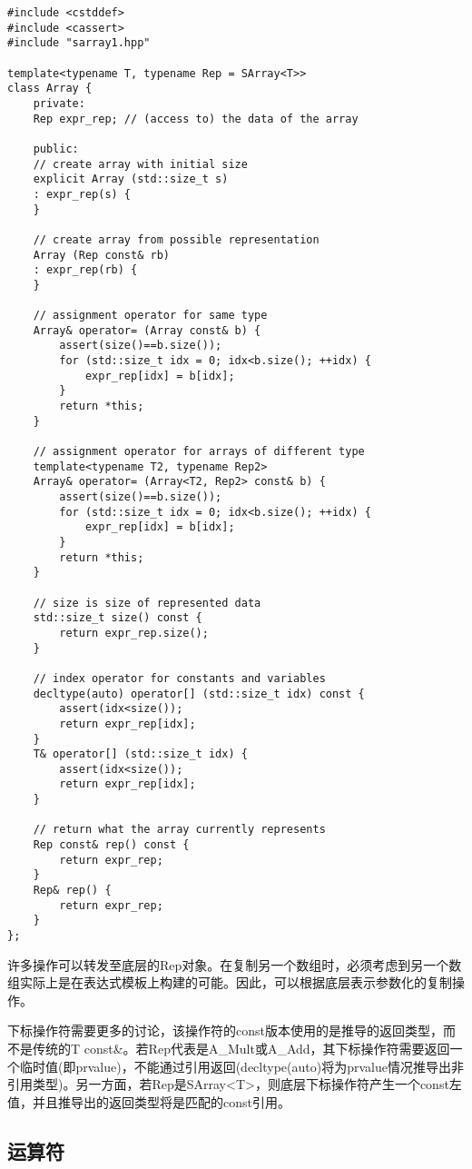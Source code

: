 \begin{lstlisting}[style=styleCXX]
#include <cstddef>
#include <cassert>
#include "sarray1.hpp"

template<typename T, typename Rep = SArray<T>>
class Array {
	private:
	Rep expr_rep; // (access to) the data of the array
	
	public:
	// create array with initial size
	explicit Array (std::size_t s)
	: expr_rep(s) {
	}

	// create array from possible representation
	Array (Rep const& rb)
	: expr_rep(rb) {
	}

	// assignment operator for same type
	Array& operator= (Array const& b) {
		assert(size()==b.size());
		for (std::size_t idx = 0; idx<b.size(); ++idx) {
			expr_rep[idx] = b[idx];
		}
		return *this;
	}

	// assignment operator for arrays of different type
	template<typename T2, typename Rep2>
	Array& operator= (Array<T2, Rep2> const& b) {
		assert(size()==b.size());
		for (std::size_t idx = 0; idx<b.size(); ++idx) {
			expr_rep[idx] = b[idx];
		}
		return *this;
	}

	// size is size of represented data
	std::size_t size() const {
		return expr_rep.size();
	}

	// index operator for constants and variables
	decltype(auto) operator[] (std::size_t idx) const {
		assert(idx<size());
		return expr_rep[idx];
	}
	T& operator[] (std::size_t idx) {
		assert(idx<size());
		return expr_rep[idx];
	}

	// return what the array currently represents
	Rep const& rep() const {
		return expr_rep;
	}
	Rep& rep() {
		return expr_rep;
	}
};
\end{lstlisting}

许多操作可以转发至底层的Rep对象。在复制另一个数组时，必须考虑到另一个数组实际上是在表达式模板上构建的可能。因此，可以根据底层表示参数化的复制操作。

下标操作符需要更多的讨论，该操作符的const版本使用的是推导的返回类型，而不是传统的T const\&。若Rep代表是A\_Mult或A\_Add，其下标操作符需要返回一个临时值(即prvalue)，不能通过引用返回(decltype(auto)将为prvalue情况推导出非引用类型)。另一方面，若Rep是SArray<T>，则底层下标操作符产生一个const左值，并且推导出的返回类型将是匹配的const引用。

\subsection{运算符}

